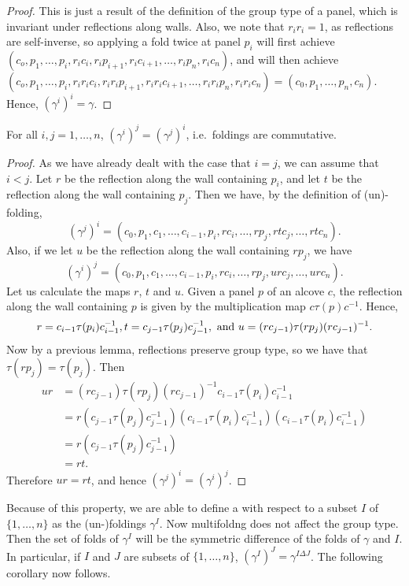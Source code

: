 \documentclass[11pt]{article}
\begin{document}
\begin{proof}
    This is just a result of the definition of the group type of a panel, which is invariant under reflections along walls. Also, we note that $r_ir_i=1$, as reflections are self-inverse, so applying a fold twice at panel $p_i$ will first achieve $(c_o,p_1,\hdots,p_i,r_ic_i,r_ip_{i+1},r_ic_{i+1},\hdots ,r_ip_n,r_ic_n)$, and will then achieve $(c_o,p_1,\hdots ,p_i,r_ir_ic_i,r_ir_ip_{i+1},r_ir_ic_{i+1},\hdots ,r_ir_ip_n,r_ir_ic_n)=(c_0,p_1,\hdots ,p_n,c_n)$. Hence, $(\gamma^i)^i=\gamma$.
\end{proof}

\begin{lemma}
    For all $i,j=1,\hdots,n$, $(\gamma^i)^j=(\gamma^j)^i$, i.e.\ foldings are commutative.
\end{lemma}

\begin{proof}
    As we have already dealt with the case that $i=j$, we can assume that $i<j$. Let $r$ be the reflection along the wall containing $p_i$, and let $t$ be the reflection along the wall containing $p_j$. Then we have, by the definition of (un)-folding,
    \[(\gamma^j)^i=(c_0,p_1,c_1,\hdots,c_{i-1},p_i,rc_i,\hdots ,rp_j,rtc_j,\hdots ,rtc_n).\]
    Also, if we let $u$ be the reflection along the wall containing $rp_j$, we have
    \[(\gamma^i)^j=(c_0,p_1,c_1,\hdots ,c_{i-1},p_i,rc_i,\hdots ,rp_j,urc_j,\hdots ,urc_n).\]
    Let us calculate the maps $r$, $t$ and $u$. Given a panel $p$ of an alcove $c$, the reflection along the wall containing $p$ is given by the multiplication map $c\tau(p)c^{-1}$. Hence,
    \[r=c_{i-1}\tau(p_i)c_{i-1}^{-1}, t=c_{j-1}\tau(p_j)c_{j-1}^{-1}, \textnormal{ and } u=(rc_{j-1})\tau(rp_j)(rc_{j-1})^{-1}.\]
    Now by a previous lemma, reflections preserve group type, so we have that $\tau(rp_j)=\tau(p_j)$. Then
    \[\begin{aligned}
        ur & =(rc_{j-1})\tau(rp_j)(rc_{j-1})^{-1}c_{i-1}\tau(p_i)c_{i-1}^{-1}\\
           & =r(c_{j-1}\tau(p_j)c_{j-1}^{-1})(c_{i-1}\tau(p_i)c_{i-1}^{-1})(c_{i-1}\tau(p_i)c_{i-1}^{-1})\\
           & = r(c_{j-1}\tau(p_j)c_{j-1}^{-1})\\
           & =rt.
    \end{aligned}\]
    Therefore $ur=rt$, and hence $(\gamma^j)^i=(\gamma^i)^j$.
\end{proof}

Because of this property, we are able to define a  with respect to a subset $I$ of $\{1,\hdots ,n\}$ as the (un-)foldings $\gamma^I$. Now multifoldng does not affect the group type. Then the set of folds of $\gamma^I$ will be the symmetric difference of the folds of $\gamma$ and $I$. In particular, if $I$ and $J$ are subsets of $\{1,\hdots ,n\}$, $(\gamma^I)^J=\gamma^{I\Delta J}$. The following corollary now follows.
\end{document}
